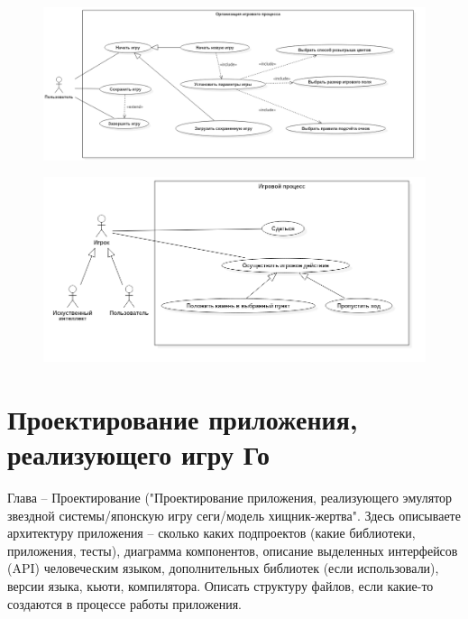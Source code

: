 \begin{figure}[H]
	\begin{center}
		\includegraphics[scale=0.65]{../UMLdiagrams/UseCase/GameOrganisation.png}
		\label{pic:GameOrganisation}
	\end{center}
\end{figure}

\begin{figure}[H]
	\begin{center}
		\includegraphics[scale=0.545]{../UMLdiagrams/UseCase/GameProcess.png}
		\label{pic:GameProcess}
	\end{center}
\end{figure}

\section*{Проектирование приложения, реализующего игру Го}

Глава -- Проектирование ("Проектирование приложения, реализующего эмулятор звездной системы/японскую игру сеги/модель хищник-жертва". Здесь описываете архитектуру приложения -- сколько каких подпроектов (какие библиотеки, приложения, тесты), диаграмма компонентов, описание выделенных интерфейсов (API) человеческим языком, дополнительных библиотек (если использовали), версии языка, кьюти, компилятора. Описать структуру файлов, если какие-то создаются в процессе работы приложения.\\


